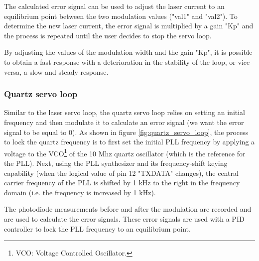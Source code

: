 \documentclass[a4paper,12pt]{article}
\begin{document}
The calculated error signal can be used to adjust the laser current to an equilibrium point between the two modulation values ("val1" and "val2"). To determine the new laser current, the error signal is multiplied by a gain "Kp" and the process is repeated until the user decides to stop the servo loop. 

By adjusting the values of the modulation width and the gain "Kp", it is possible to obtain a fast response with a deterioration in the stability of the loop, or vice-versa, a slow and steady response.

\subsubsection{Quartz servo loop}

Similar to the laser servo loop, the quartz servo loop relies on setting an initial frequency and then modulate it to calculate an error signal (we want the error signal to be equal to 0). As shown in figure \ref{fig:quartz_servo_loop}, the process to lock the quartz frequency is to first set the initial PLL frequency by applying a voltage to the VCO\footnote{VCO: Voltage Controlled Oscillator.} of the 10 Mhz quartz oscillator (which is the reference for the PLL). Next, using the PLL synthesizer and its frequency-shift keying capability (when the logical value of pin 12 "TXDATA" changes), the central carrier frequency of the PLL is shifted by 1 kHz to the right in the frequency domain (i.e. the frequency is increased by 1 kHz).

The photodiode measurements before and after the modulation are recorded and are used to calculate the error signals. These error signals are used with a PID controller to lock the PLL frequency to an equilibrium point.
\end{document}
